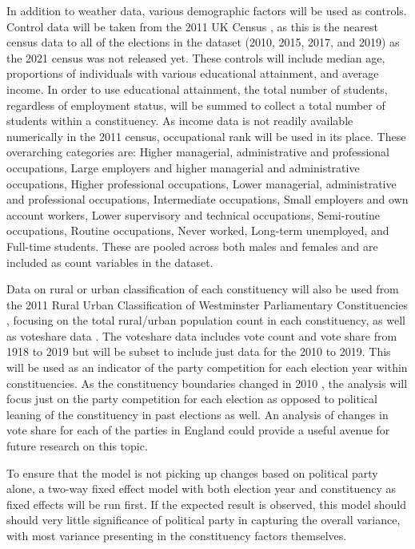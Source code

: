 \documentclass[preprint]{elsarticle} %
\begin{document}
In addition to weather data, various demographic factors will be used as controls. Control data will be taken from the 2011 UK Census \citep{2011CensusOffice}, as this is the nearest census data to all of the elections in the dataset (2010, 2015, 2017, and 2019) as the 2021 census was not released yet. These controls will include median age, proportions of individuals with various educational attainment, and average income. In order to use educational attainment, the total number of students, regardless of employment status, will be summed to collect a total number of students within a constituency. As income data is not readily available numerically in the 2011 census, occupational rank will be used in its place. These overarching categories are: Higher managerial, administrative and professional occupations, Large employers and higher managerial and administrative occupations, Higher professional occupations, Lower managerial, administrative and professional occupations, Intermediate occupations, Small employers and own account workers, Lower supervisory and technical occupations, Semi-routine occupations, Routine occupations, Never worked, Long-term unemployed, and Full-time students. These are pooled across both males and females and are included as count variables in the dataset.

Data on rural or urban classification of each constituency will also be used from the 2011 Rural Urban Classification of Westminster Parliamentary Constituencies \citep{RuralUrbanClassification}, focusing on the total rural/urban population count in each constituency, as well as voteshare data \citep{watsonGeneralElectionResults2024}. The voteshare data includes vote count and vote share from 1918 to 2019 but will be subset to include just data for the 2010 to 2019. This will be used as an indicator of the party competition for each election year within constituencies. As the constituency boundaries changed in 2010 \citep{cracknell2010GeneralElection2024}, the analysis will focus just on the party competition for each election as opposed to political leaning of the constituency in past elections as well. An analysis of changes in vote share for each of the parties in England could provide a useful avenue for future research on this topic. 

To ensure that the model is not picking up changes based on political party alone, a two-way fixed effect model with both election year and constituency as fixed effects will be run first. If the expected result is observed, this model should should very little significance of political party in capturing the overall variance, with most variance presenting in the constituency factors themselves.
\end{document}
